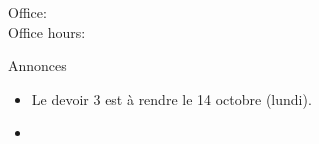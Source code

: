 \documentclass{beamer}
\subtitle[Métier et \lexi{c'est} et \lexi{il est}]{Les métiers et \lexi{c'est} contre \lexi{il est}}
\begin{document}
  \begin{frame}
    \titlepage
    \tiny{Office: \\
          Office hours: }
  \end{frame}

  \begin{frame}{Annonces }
    \begin{itemize}
      \item Le devoir 3 est à rendre le 14 octobre (lundi).
      \item[] 
    \end{itemize}
  \end{frame}

\end{document}
